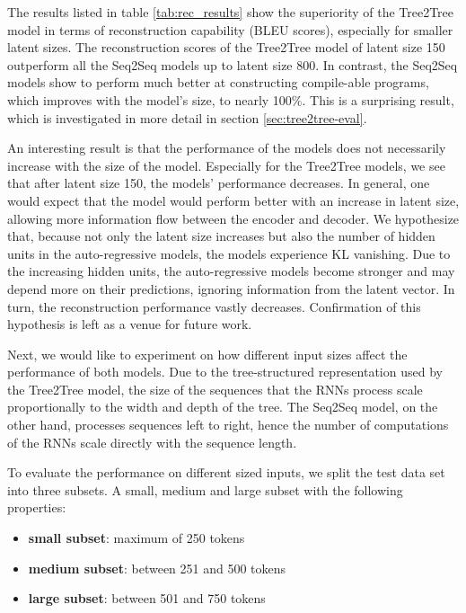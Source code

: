 The results listed in table \ref{tab:rec_results} show the superiority of the Tree2Tree model in terms of reconstruction capability (BLEU scores), especially for smaller latent sizes. The reconstruction scores of the Tree2Tree model of latent size 150 outperform all the Seq2Seq models up to latent size 800. In contrast, the Seq2Seq models show to perform much better at constructing compile-able programs, which improves with the model's size, to nearly 100\%. This is a surprising result, which is investigated in more detail in section \ref{sec:tree2tree-eval}.

 


An interesting result is that the performance of the models does not necessarily increase with the size of the model. Especially for the Tree2Tree models, we see that after latent size 150, the models' performance decreases. In general, one would expect that the model would perform better with an increase in latent size, allowing more information flow between the encoder and decoder. We hypothesize that, because not only the latent size increases but also the number of hidden units in the auto-regressive models, the models experience KL vanishing. Due to the increasing hidden units, the auto-regressive models become stronger and may depend more on their predictions, ignoring information from the latent vector. In turn, the reconstruction performance vastly decreases. Confirmation of this hypothesis is left as a venue for future work.



Next, we would like to experiment on how different input sizes affect the performance of both models. Due to the tree-structured representation used by the Tree2Tree model, the size of the sequences that the RNNs process scale proportionally to the width and depth of the tree. The Seq2Seq model, on the other hand, processes sequences left to right, hence the number of computations of the RNNs scale directly with the sequence length. 



To evaluate the performance on different sized inputs, we split the test data set into three subsets. A small, medium and large subset with the following properties:

\begin{itemize}
    \item \textbf{small subset}: maximum of 250 tokens
    \item \textbf{medium subset}: between 251 and 500 tokens
    \item \textbf{large subset}: between 501 and 750 tokens
\end{itemize}

